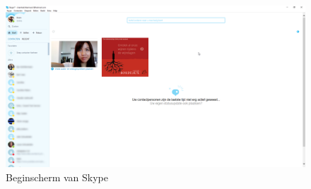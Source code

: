 \documentclass[11pt]{article}
\begin{document}
\begin{figure}
	\centering
	\includegraphics[width=1\textwidth]{Bram_ScreenshotSkype1.png}
	\caption{Beginscherm van Skype}
	\label{fig:BeginSkype}
\end{figure}
\end{document}
